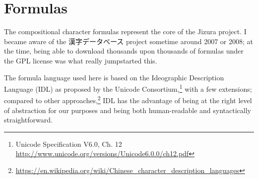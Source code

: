 \section{Formulas
}
\begin{multicols}{2}The compositional character formulas represent the core of the Jizura project.
I became aware of the {\cjk{}漢字{\ka{}データベース} }project sometime around 2007 or
2008; at the time, being able to download thousands upon thousands
of formulas under the GPL license was what really jumpstarted this.\mktsShowpar\par
The formula language used here is based on the Ideographic
Description Language (IDL) as proposed by the Unicode
Consortium,\footnote{Unicode Specification V6.0,
Ch. 12 \url{http://www.unicode.org/versions/Unicode6.0.0/ch12.pdf}}
with a few extensions; compared to other
approaches,\footnote{\url{https://en.wikipedia.org/wiki/Chinese\_character\_description\_languages}}
IDL has the advantage of being at the right level of abstraction
for our purposes and being both human-readable and syntactically
straightforward.\mktsShowpar\par
\end{multicols}\mktsEmptyLine
